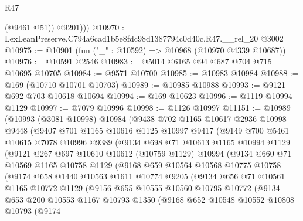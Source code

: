 \begin{lexlean}{R47}
\begin{coremodule}
            (@9461 @51))
          @9201)))
@10970 := LexLeanPreserve.C794a6cad1b5e8fdc98d1387794c0d40c.R47.__rel_20 @3002
@10975 := @10901 (fun ("_" : @10592) => @10968 (@10970 @4339 @10687))
@10976 := @10591 @2546
@10983 := @5014 @6165 @94 @687 @704 @715 @10695 @10705
@10984 := @9571 @10700
@10985 := @10983 @10984
@10988 := @169 (@10710 @10701 @10703)
@10989 := @10985 @10988
@10993 := @9121 @692 @703 @10618 @10694
@10994 := @169 @10623
@10996 := @1119 @10994 @1129
@10997 := @7079 @10996
@10998 := @1126 @10997
@11151 := @10989
    (@10993
      (@3081 @10998)
      @10984
      (@9438
        @702
        @1165
        @10617
        @2936
        @10998
        @9448
        (@9407
          @701
          @1165
          @10616
          @1125
          @10997
          @9417
          (@9149
            @700
            @5461
            @10615
            @7078
            @10996
            @9389
            (@9134
              @698
              @71
              @10613
              @1165
              @10994
              @1129
              (@9121
                @267
                @697
                @10610
                @10612
                (@10759 @1129)
                @10994
                (@9134
                  @660
                  @71
                  @10569
                  @1165
                  @10758
                  @1129
                  (@9168
                    @659
                    @10564
                    @10568
                    @10775
                    @10758
                    (@9174
                      @658
                      @1440
                      @10563
                      @1611
                      @10774
                      @9205
                      (@9134
                        @656
                        @71
                        @10561
                        @1165
                        @10772
                        @1129
                        (@9156
                          @655
                          @10555
                          @10560
                          @10795
                          @10772
                          (@9134
                            @653
                            @200
                            @10553
                            @1167
                            @10793
                            @1350
                            (@9168
                              @652
                              @10548
                              @10552
                              @10808
                              @10793
                              (@9174

\end{coremodule}
\end{lexlean}

